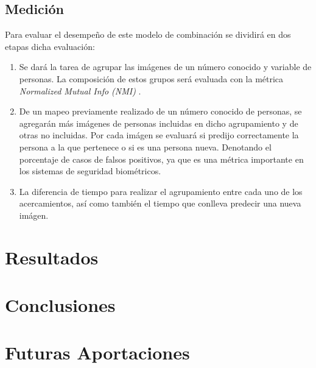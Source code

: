 \documentclass[a4paper, 10pt, conference]{ieeeconf}      %
\begin{document}
    \subsection{Medición}
    Para evaluar el desempeño de este modelo de combinación se dividirá en dos etapas dicha
    evaluación:
    \begin{enumerate}
        \item Se dará la tarea de agrupar las imágenes de un número conocido y variable de
            personas. La composición de estos grupos será evaluada con la métrica
            \textit{Normalized Mutual Info (NMI)} \cite{NMI}.
        \item De un mapeo previamente realizado de un número conocido de personas, se agregarán
            más imágenes de personas incluidas en dicho agrupamiento y de otras no incluidas. Por
            cada imágen se evaluará si predijo correctamente la persona a la que pertenece o si
            es una persona nueva. Denotando el porcentaje de casos de falsos positivos,
            ya que es una métrica importante en los sistemas de seguridad biométricos.
        \item La diferencia de tiempo para realizar el agrupamiento entre cada uno de los
            acercamientos, así como también el tiempo que conlleva predecir una nueva imágen.
    \end{enumerate}

    \section{Resultados}

    \section{Conclusiones}

    \section{Futuras Aportaciones}

\end{document}
